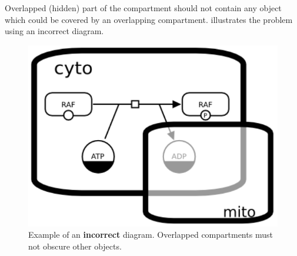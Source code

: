 Overlapped (hidden) part of the compartment should not contain any object which could be covered by an overlapping compartment.   illustrates the problem using an incorrect diagram.

\begin{figure}[H]
  \centering
  \includegraphics[scale = 0.45]{examples/compartment_overlapping_wrong}
  \caption{Example of an \textbf{incorrect} diagram.  Overlapped compartments must not obscure other objects.}
  \label{fig:overlap-bad}
\end{figure}





